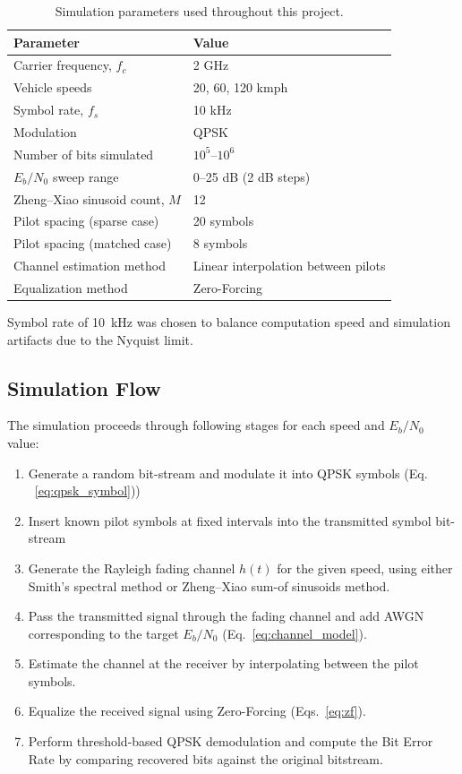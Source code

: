 \documentclass[12pt]{article}
\begin{document}
\begin{table}[htbp]
\centering
\begin{tabular}{ll}
\hline
\textbf{Parameter} & \textbf{Value} \\
\hline
Carrier frequency, $f_c$        & 2 GHz \\
Vehicle speeds                  & 20, 60, 120 kmph \\
Symbol rate, $f_s$               & 10 kHz \\
Modulation                      & QPSK \\
Number of bits simulated        & $10^5$--$10^6$ \\
$E_b/N_0$ sweep range            & 0--25 dB (2 dB steps) \\
Zheng--Xiao sinusoid count, $M$  & 12 \\
Pilot spacing (sparse case)     & 20 symbols \\
Pilot spacing (matched case)    & 8 symbols \\
Channel estimation method       & Linear interpolation between pilots \\
Equalization method             & Zero-Forcing \\
\hline
\end{tabular}
\caption{Simulation parameters used throughout this project.}
\label{tab:params}
\end{table}

Symbol rate of 10~kHz was chosen to balance computation speed and simulation
artifacts due to the Nyquist limit.

\subsection{Simulation Flow}

The simulation proceeds through following stages for each speed and $E_b/N_0$ value:

\begin{enumerate}
    \item Generate a random bit-stream and modulate it into QPSK symbols (Eq. ~\ref{eq:qpsk_symbol}))
    \item Insert known pilot symbols at fixed intervals into the transmitted symbol bit-stream
    \item Generate the Rayleigh fading channel $h(t)$ for the given speed, using either Smith's spectral method or Zheng--Xiao sum-of sinusoids method.
    \item Pass the transmitted signal through the fading channel and add AWGN corresponding to the target $E_b/N_0$ (Eq.~\ref{eq:channel_model}).
    \item Estimate the channel at the receiver by interpolating between the pilot symbols.
    \item Equalize the received signal using Zero-Forcing (Eqs.~\ref{eq:zf}).
    \item Perform threshold-based QPSK demodulation and compute the Bit Error Rate by comparing recovered bits against the original bitstream.
\end{enumerate}
\end{document}
